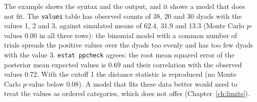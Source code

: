 The example shows the syntax and the output, and it shows a model that does not fit. The \texttt{values} table has observed counts of 38, 20 and 30 dyads with the values 1, 2 and 3, against simulated means of 62.4, 31.9 and 13.3 (Monte Carlo $p$-values 0.00 in all three rows): the binomial model with a common number of trials spreads the positive values over the dyads too evenly and has too few dyads with the value 3. \texttt{estat ppcheck} agrees: the root mean squared error of the posterior mean expected values is 0.69 and their correlation with the observed values 0.72. With the cutoff 1 the distance statistic is reproduced (no Monte Carlo $p$-value below 0.08). A model that fits these data better would need to treat the values as ordered categories, which \nwlsm{} does not offer (Chapter~\ref{ch:limits}).
